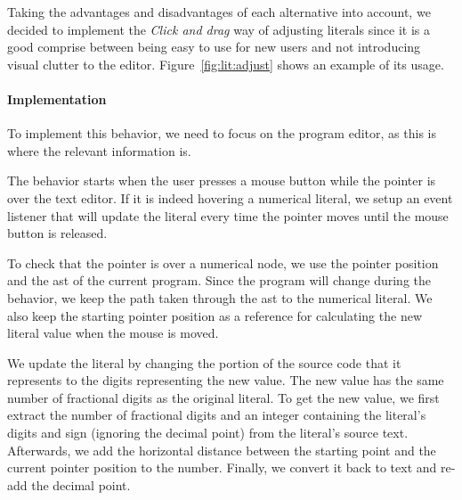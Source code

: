 Taking the advantages and disadvantages of each alternative into account, we decided to implement the {\it Click and drag} way of adjusting literals since it is a good comprise between being easy to use for new users and not introducing visual clutter to the editor.
Figure~\ref{fig:lit:adjust} shows an example of its usage.

\paragraph{Implementation}
To implement this behavior, we need to focus on the program editor, as this is where the relevant information is.

The behavior starts when the user presses a mouse button while the pointer is over the text editor.
If it is indeed hovering a numerical literal, we setup an event listener that will update the literal every time the pointer moves until the mouse button is released.

To check that the pointer is over a numerical node, we use the pointer position and the \gls{ast} of the current program.
Since the program will change during the behavior, we keep the path taken through the \gls{ast} to the numerical literal.
We also keep the starting pointer position as a reference for calculating the new literal value when the mouse is moved.

We update the literal by changing the portion of the source code that it represents to the digits representing the new value.
The new value has the same number of fractional digits as the original literal.
To get the new value, we first extract the number of fractional digits and an integer containing the literal's digits and sign (ignoring the decimal point) from the literal's source text.
Afterwards, we add the horizontal distance between the starting point and the current pointer position to the number.
Finally, we convert it back to text and re-add the decimal point.

